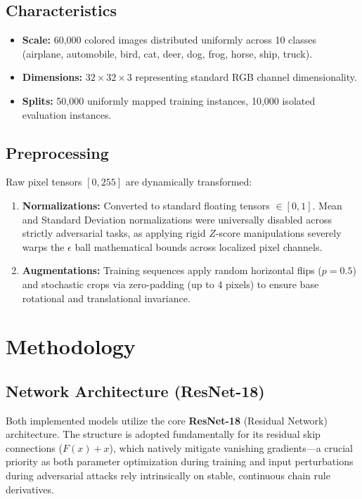 \documentclass[12pt,a4paper]{article}
\begin{document}
\subsection{Characteristics}
\begin{itemize}
    \item \textbf{Scale:} 60,000 colored images distributed uniformly across 10 classes (airplane, automobile, bird, cat, deer, dog, frog, horse, ship, truck).
    \item \textbf{Dimensions:} $32 \times 32 \times 3$ representing standard RGB channel dimensionality.
    \item \textbf{Splits:} 50,000 uniformly mapped training instances, 10,000 isolated evaluation instances.
\end{itemize}

\subsection{Preprocessing}
Raw pixel tensors $[0, 255]$ are dynamically transformed:
\begin{enumerate}
    \item \textbf{Normalizations:} Converted to standard floating tensors $\in [0, 1]$. Mean and Standard Deviation normalizations were universally disabled across strictly adversarial tasks, as applying rigid $Z$-score manipulations severely warps the $\epsilon$ ball mathematical bounds across localized pixel channels.
    \item \textbf{Augmentations:} Training sequences apply random horizontal flips ($p=0.5$) and stochastic crops via zero-padding (up to 4 pixels) to ensure base rotational and translational invariance.
\end{enumerate}

\section{Methodology}
\subsection{Network Architecture (ResNet-18)}
Both implemented models utilize the core \textbf{ResNet-18} (Residual Network) architecture. The structure is adopted fundamentally for its residual skip connections ($F(x) + x$), which natively mitigate vanishing gradients—a crucial priority as both parameter optimization during training and input perturbations during adversarial attacks rely intrinsically on stable, continuous chain rule derivatives.
\end{document}
